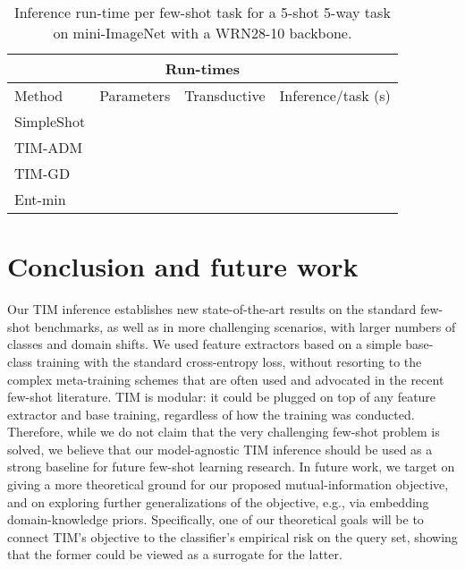 \documentclass{article}
\newcommand{\cmark}{\ding{51}}\newcommand{\xmark}{\ding{55}}\newcommand{\CC}{\mathcal{C}}
\begin{document}
        \begin{table}[t]
            \centering
                \begin{tabular}{lccc}
                    \multicolumn{4}{c}{\textbf{Run-times}} \\
                    \toprule
                    Method & Parameters & Transductive & Inference/task (s) \\
                    \toprule
                    SimpleShot \cite{simpleshot}&  & \xmark &  \\
                    \midrule
\rowcolor{Gray} TIM-ADM &  & & \\
                    \rowcolor{Gray} TIM-GD &  & & \\
                    Ent-min \cite{dhillon2019baseline} &  & \multirow{-4}{*}{\cmark} &  \\
                    \bottomrule
                \end{tabular}
            \caption{Inference run-time per few-shot task for a 5-shot 5-way task on mini-ImageNet with a WRN28-10 backbone.}
            \label{tab:runtimes}
        \end{table}

 
\section{Conclusion and future work}

Our TIM inference establishes new state-of-the-art results on the standard few-shot benchmarks, as well as in more challenging scenarios, with larger numbers of classes and domain shifts. We used feature extractors based on a simple base-class training with the standard cross-entropy loss, without resorting to the complex meta-training schemes that are often used and advocated in the recent few-shot literature. TIM is modular: it could be plugged on top of any feature extractor and base training, regardless of how the training was conducted. Therefore, while we do not claim that the very challenging few-shot problem is solved, we believe that our model-agnostic TIM inference should be used as a strong baseline for future few-shot learning research. In future work, we target on giving a more theoretical ground for our proposed mutual-information objective, and on exploring further generalizations of the objective, e.g., via embedding domain-knowledge priors. Specifically, one of our theoretical goals will be to connect TIM's objective to the classifier's empirical risk on the query set, showing that the former could be viewed as a surrogate for the latter.
\end{document}
